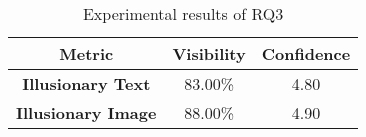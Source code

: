 \begin{table}[t!]
    \centering
    \tabcolsep=1.5pt
    \renewcommand{\arraystretch}{0.92} 
    \caption{Experimental results of RQ3}
    \begin{tabular}{c|cc}
    \hline
    \textbf{Metric}                          & \textbf{Visibility} & \textbf{Confidence} \\ \hline
    \textbf{Illusionary Text}  & 83.00\%    & 4.80   \\ \hline
    \textbf{Illusionary Image} & 88.00\%    & 4.90        \\ \hline
    \end{tabular}
\label{tex:RQ1}
\end{table}